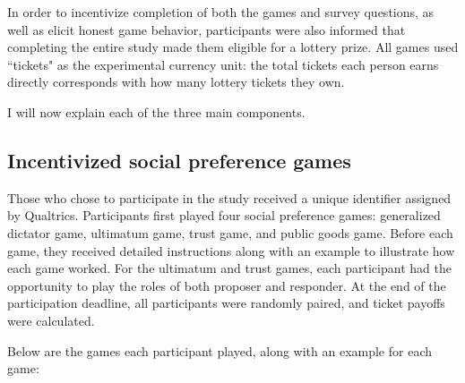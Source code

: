 \documentclass[12pt]{article}
\begin{document}
In order to incentivize completion of both the games and survey questions, as well as elicit honest game behavior, participants were also informed that completing the entire study made them eligible for a lottery prize. All games used ``tickets" as the experimental currency unit: the total tickets each person earns directly corresponds with how many lottery tickets they own.

I will now explain each of the three main components.

\subsection{Incentivized social preference games}

Those who chose to participate in the study received a unique identifier assigned by Qualtrics. Participants first played four social preference games: generalized dictator game, ultimatum game, trust game, and public goods game. Before each game, they received detailed instructions along with an example to illustrate how each game worked. For the ultimatum and trust games, each participant had the opportunity to play the roles of both proposer and responder. At the end of the participation deadline, all participants were randomly paired, and ticket payoffs were calculated.

Below are the games each participant played, along with an example for each game: 
\end{document}
